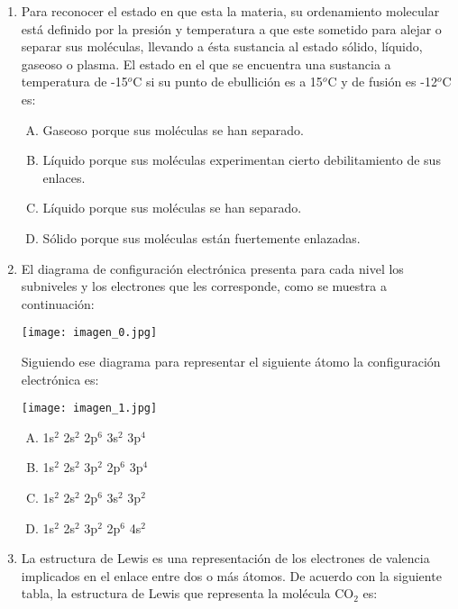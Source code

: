 
\begin{enumerate}
\item Para reconocer el estado en que esta la materia, su ordenamiento molecular está definido por la presión y temperatura a que este sometido para alejar o separar sus moléculas, llevando a ésta sustancia al estado sólido, líquido, gaseoso o plasma. El estado en el que se encuentra una sustancia a temperatura de -15$^o$C si su punto de ebullición es a 15$^o$C y de fusión es -12$^o$C es: \label{mon-1}


\begin{enumerate}[(A)]
\item Gaseoso porque sus moléculas se han separado.
\item Líquido porque sus moléculas experimentan cierto debilitamiento de sus enlaces. 
\item Líquido porque sus moléculas se han separado. 
\item Sólido porque sus moléculas están fuertemente enlazadas. 
\end{enumerate}

\newpage
\item El diagrama de configuración electrónica presenta para cada nivel los subniveles y los electrones que les corresponde, como se muestra a continuación: \label{mon-2}

\begin{center}
\texttt{[image: imagen\_0.jpg]}
\end{center}

Siguiendo ese diagrama para representar el siguiente átomo la configuración electrónica es:

\begin{center}
\texttt{[image: imagen\_1.jpg]}
\end{center}

\begin{enumerate}[(A)]
\item 1s$^2$ 2s$^2$ 2p$^6$ 3s$^2$ 3p$^4$
\item 1s$^2$ 2s$^2$ 3p$^2$ 2p$^6$ 3p$^4$
\item 1s$^2$ 2s$^2$ 2p$^6$ 3s$^2$ 3p$^2$
\item 1s$^2$ 2s$^2$ 3p$^2$ 2p$^6$ 4s$^2$
\end{enumerate}

\item La estructura de Lewis es una representación de los electrones de valencia implicados en el enlace entre dos o más átomos. De acuerdo con la siguiente tabla, la estructura de Lewis que representa la molécula CO$_2$ es:\label{mon-3}



\end{enumerate}
